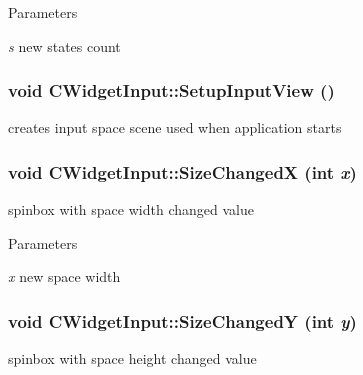 \begin{DoxyParams}{Parameters}
\item[{\em s}]new states count \end{DoxyParams}
\hypertarget{classCWidgetInput_ae5a1b1557fa5bbac8aa208584a3fa6c5}{
\subsubsection[{SetupInputView}]{\setlength{\rightskip}{0pt plus 5cm}void CWidgetInput::SetupInputView ()}}
\label{classCWidgetInput_ae5a1b1557fa5bbac8aa208584a3fa6c5}
creates input space scene used when application starts \hypertarget{classCWidgetInput_a68fcce29dd80cbc85cbab1390c2ac76e}{
\subsubsection[{SizeChangedX}]{\setlength{\rightskip}{0pt plus 5cm}void CWidgetInput::SizeChangedX (int {\em x})}}
\label{classCWidgetInput_a68fcce29dd80cbc85cbab1390c2ac76e}
spinbox with space width changed value


\begin{DoxyParams}{Parameters}
\item[{\em x}]new space width \end{DoxyParams}
\hypertarget{classCWidgetInput_a73741d0ba03a59ac34dc00a7f789778c}{
\subsubsection[{SizeChangedY}]{\setlength{\rightskip}{0pt plus 5cm}void CWidgetInput::SizeChangedY (int {\em y})}}
\label{classCWidgetInput_a73741d0ba03a59ac34dc00a7f789778c}
spinbox with space height changed value


